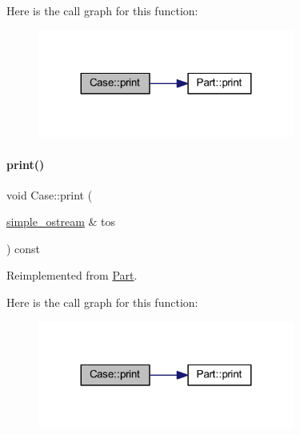 Here is the call graph for this function\+:
\nopagebreak
\begin{figure}[H]
\begin{center}
\leavevmode
\includegraphics[width=239pt]{class_case_ae179519844b825815f4accddafae13b6_cgraph}
\end{center}
\end{figure}
\mbox{\label{class_case_a580b6870ea256cab7e7eee36820803e7}} 
\paragraph{\texorpdfstring{print()}{print()}\hspace{0.1cm}{\footnotesize\ttfamily [3/4]}}
{\footnotesize\ttfamily void Case\+::print (\begin{DoxyParamCaption}\item[{\mbox{\hyperlink{structsimple__ostream}{simple\+\_\+ostream}} \&}]{tos }\end{DoxyParamCaption}) const\hspace{0.3cm}{\ttfamily [virtual]}}



Reimplemented from \mbox{\hyperlink{class_part_aa602d876151b63db72cf8f666847a8cd}{Part}}.

Here is the call graph for this function\+:
\nopagebreak
\begin{figure}[H]
\begin{center}
\leavevmode
\includegraphics[width=239pt]{class_case_a580b6870ea256cab7e7eee36820803e7_cgraph}
\end{center}
\end{figure}
\mbox{\label{class_case_a6cce910485e45c0b30018fce491c154f}} 
